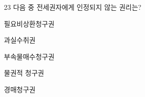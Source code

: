 \begin{question}{23}
다음 중 전세권자에게 인정되지 않는 권리는?
\begin{choices}
  \item 필요비상환청구권
  \item 과실수취권
  \item 부속물매수청구권
  \item 물권적 청구권
  \item 경매청구권
\end{choices}
\end{question}
